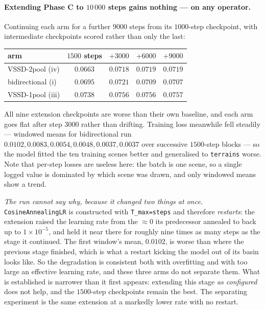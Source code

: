 \documentclass[11pt,a4paper]{article}
\begin{document}
\paragraph{Extending Phase C to $10\,000$ steps gains nothing --- on any operator.} Continuing
each arm for a further $9000$ steps from its $1000$-step checkpoint, with intermediate
checkpoints scored rather than only the last:
\begin{center}\small
\begin{tabular}{lcccc}
\toprule
arm & $1500$ steps & $+3000$ & $+6000$ & $+9000$ \\
\midrule
VSSD-2pool (iv) & $\mathbf{0.0663}$ & $0.0718$ & $0.0719$ & $0.0719$ \\
bidirectional (i)        & $\mathbf{0.0695}$ & $0.0721$ & $0.0709$ & $0.0707$ \\
VSSD-1pool (iii)      & $\mathbf{0.0738}$ & $0.0756$ & $0.0756$ & $0.0757$ \\
\bottomrule
\end{tabular}
\end{center}
\noindent All nine extension checkpoints are worse than their own baseline, and each arm goes
flat after step $3000$ rather than drifting. Training loss meanwhile fell steadily --- windowed
means for bidirectional run $0.0102, 0.0083, 0.0054, 0.0048, 0.0037, 0.0037$ over successive
$1500$-step blocks --- so the model fitted the ten training scenes better and generalised to
\texttt{terrains} worse. Note that per-step losses are useless here: the batch is one scene, so a
single logged value is dominated by which scene was drawn, and only windowed means show a trend.

\emph{The run cannot say why, because it changed two things at once.}
\texttt{CosineAnnealingLR} is constructed with \texttt{T\_max=steps} and therefore \emph{restarts}:
the extension raised the learning rate from the $\approx0$ its predecessor annealed to back up to
$1\times10^{-5}$, and held it near there for roughly nine times as many steps as the stage it
continued. The first window's mean, $0.0102$, is worse than where the previous stage finished,
which is what a restart kicking the model out of its basin looks like. So the degradation is
consistent both with overfitting and with too large an effective learning rate, and these three
arms do not separate them. What is established is narrower than it first appears: extending this
stage \emph{as configured} does not help, and the $1500$-step checkpoints remain the best.
The separating experiment is the same extension at a markedly lower rate with no restart.
\end{document}
